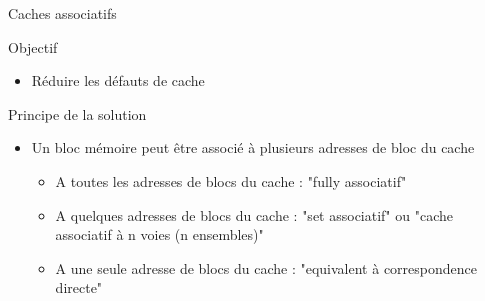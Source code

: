 %
\begin{Frame}{Caches associatifs}


      \begin{block}{Objectif}
       \begin{center}
 	\begin{itemize}
         \item Réduire les défauts de cache
        \end{itemize}
       \end{center}
      \end{block}   

  


  

  \begin{block}{Principe de la solution}
    \begin{center}
 	\begin{itemize}
        \item Un bloc mémoire peut être associé à plusieurs adresses de bloc du cache
		\begin{itemize}
		  \item A toutes les adresses de blocs du cache : "fully associatif"
		  \item A quelques adresses de blocs du cache : "set associatif" ou "cache associatif à n voies (n ensembles)"
		  \item A une seule adresse de blocs du cache : "equivalent à correspondence directe"
		\end{itemize}
        \end{itemize}
    \end{center}
  \end{block}   

 

\end{Frame}



